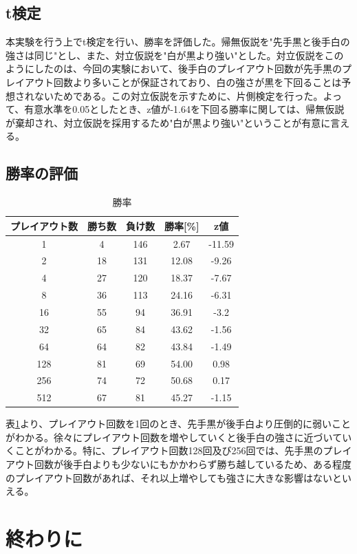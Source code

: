 \documentclass[10pt, a4paper]{jsarticle}
\begin{document}
\subsection{t検定}
本実験を行う上でt検定を行い、勝率を評価した。帰無仮説を"先手黒と後手白の強さは同じ"とし、また、対立仮説を"白が黒より強い"とした。対立仮説をこのようにしたのは、今回の実験において、後手白のプレイアウト回数が先手黒のプレイアウト回数より多いことが保証されており、白の強さが黒を下回ることは予想されないためである。この対立仮説を示すために、片側検定を行った。よって、有意水準を0.05としたとき、z値が-1.64を下回る勝率に関しては、帰無仮説が棄却され、対立仮説を採用するため"白が黒より強い"ということが有意に言える。
\subsection{勝率の評価}
\begin{table}[ht]
    \begin{center}
        \begin{tabular}{c|c|c|c|c}
            プレイアウト数 & 勝ち数 & 負け数 & 勝率[\%] & z値 \\ \hline
            1 & 4 & 146 & 2.67 & -11.59 \\
            2 & 18 & 131 & 12.08 & -9.26 \\
            4 & 27 & 120 & 18.37 & -7.67 \\
            8 & 36 & 113 & 24.16 & -6.31 \\
            16 & 55 & 94 & 36.91 & -3.2 \\
            32 & 65 & 84 & 43.62 & -1.56 \\
            64 & 64 & 82 & 43.84 & -1.49 \\
            128 & 81 & 69 & 54.00 & 0.98 \\
            256 & 74 & 72 & 50.68 & 0.17 \\
            512 & 67 & 81 & 45.27 & -1.15
        \end{tabular}
        \caption{勝率}
        \label{tab:win_rate}
    \end{center}
\end{table}
\par 表\ref{tab:win_rate}より、プレイアウト回数を1回のとき、先手黒が後手白より圧倒的に弱いことがわかる。徐々にプレイアウト回数を増やしていくと後手白の強さに近づいていくことがわかる。特に、プレイアウト回数128回及び256回では、先手黒のプレイアウト回数が後手白よりも少ないにもかかわらず勝ち越しているため、ある程度のプレイアウト回数があれば、それ以上増やしても強さに大きな影響はないといえる。
\section{終わりに}
\end{document}
